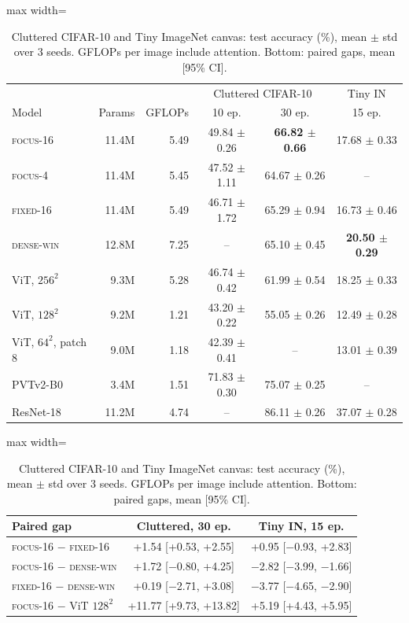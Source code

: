 \documentclass[runningheads]{llncs}
\newcommand{\focus}{\textsc{focus}}
\newcommand{\fixed}{\textsc{fixed}}
\newcommand{\densewin}{\textsc{dense-win}}
\begin{document}
\begin{table}[t]
\centering
\caption{Cluttered CIFAR-10 and Tiny ImageNet canvas: test accuracy (\%), mean $\pm$ std over 3
seeds. GFLOPs per image include attention. Bottom: paired gaps, mean [95\% CI].}
\label{tab:main}
\begin{adjustbox}{max width=\linewidth}
\begin{tabular}{lrrccc}
\toprule
& & & \multicolumn{2}{c}{Cluttered CIFAR-10} & Tiny IN \\
Model & Params & GFLOPs & 10 ep. & 30 ep. & 15 ep. \\
\midrule
\focus-16 & 11.4M & 5.49 & 49.84 $\pm$ 0.26 & \textbf{66.82 $\pm$ 0.66} & 17.68 $\pm$ 0.33 \\
\focus-4 & 11.4M & 5.45 & 47.52 $\pm$ 1.11 & 64.67 $\pm$ 0.26 & -- \\
\fixed-16 & 11.4M & 5.49 & 46.71 $\pm$ 1.72 & 65.29 $\pm$ 0.94 & 16.73 $\pm$ 0.46 \\
\densewin & 12.8M & 7.25 & -- & 65.10 $\pm$ 0.45 & \textbf{20.50 $\pm$ 0.29} \\
ViT, $256^2$ & 9.3M & 5.28 & 46.74 $\pm$ 0.42 & 61.99 $\pm$ 0.54 & 18.25 $\pm$ 0.33 \\
ViT, $128^2$ & 9.2M & 1.21 & 43.20 $\pm$ 0.22 & 55.05 $\pm$ 0.26 & 12.49 $\pm$ 0.28 \\
ViT, $64^2$, patch 8 & 9.0M & 1.18 & 42.39 $\pm$ 0.41 & -- & 13.01 $\pm$ 0.39 \\
\midrule
PVTv2-B0 & 3.4M & 1.51 & 71.83 $\pm$ 0.30 & 75.07 $\pm$ 0.25 & -- \\
ResNet-18 & 11.2M & 4.74 & -- & 86.11 $\pm$ 0.26 & 37.07 $\pm$ 0.28 \\
\bottomrule
\end{tabular}
\end{adjustbox}

\vspace{2mm}
\begin{adjustbox}{max width=\linewidth}
\begin{tabular}{lcc}
\toprule
Paired gap & Cluttered, 30 ep. & Tiny IN, 15 ep. \\
\midrule
\focus-16 $-$ \fixed-16 & +1.54 [+0.53, +2.55] & +0.95 [$-$0.93, +2.83] \\
\focus-16 $-$ \densewin & +1.72 [$-$0.80, +4.25] & $-$2.82 [$-$3.99, $-$1.66] \\
\fixed-16 $-$ \densewin & +0.19 [$-$2.71, +3.08] & $-$3.77 [$-$4.65, $-$2.90] \\
\focus-16 $-$ ViT $128^2$ & +11.77 [+9.73, +13.82] & +5.19 [+4.43, +5.95] \\
\bottomrule
\end{tabular}
\end{adjustbox}
\end{table}
\end{document}
